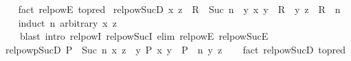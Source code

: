 \begin{isabellebody}
%
\isadelimproof
\ \ %
\endisadelimproof
%
\isatagproof
{}\isamarkupfalse%
\ {\isacharparenleft}{\kern0pt}fact\ relpow{\isacharunderscore}{\kern0pt}E\ {\isacharbrackleft}{\kern0pt}to{\isacharunderscore}{\kern0pt}pred{\isacharbrackright}{\kern0pt}{\isacharparenright}{\kern0pt}%
\endisatagproof
{\isafoldproof}%
%
\isadelimproof
\isanewline
%
\endisadelimproof
\isanewline
{}\isamarkupfalse%
\ relpow{\isacharunderscore}{\kern0pt}Suc{\isacharunderscore}{\kern0pt}D{}{\isacharcolon}{\kern0pt}\ {\isachardoublequoteopen}{\isacharparenleft}{\kern0pt}x{\isacharcomma}{\kern0pt}\ z{\isacharparenright}{\kern0pt}\ {\isasymin}\ R\ {\isacharcircum}{\kern0pt}{\isacharcircum}{\kern0pt}\ Suc\ n\ {\isasymLongrightarrow}\ {\isacharparenleft}{\kern0pt}{\isasymexists}y{\isachardot}{\kern0pt}\ {\isacharparenleft}{\kern0pt}x{\isacharcomma}{\kern0pt}\ y{\isacharparenright}{\kern0pt}\ {\isasymin}\ R\ {\isasymand}\ {\isacharparenleft}{\kern0pt}y{\isacharcomma}{\kern0pt}\ z{\isacharparenright}{\kern0pt}\ {\isasymin}\ R\ {\isacharcircum}{\kern0pt}{\isacharcircum}{\kern0pt}\ n{\isacharparenright}{\kern0pt}{\isachardoublequoteclose}\isanewline
%
\isadelimproof
\ \ %
\endisadelimproof
%
\isatagproof
{}\isamarkupfalse%
\ {\isacharparenleft}{\kern0pt}induct\ n\ arbitrary{\isacharcolon}{\kern0pt}\ x\ z{\isacharparenright}{\kern0pt}\isanewline
\ \ \ \ {\isacharparenleft}{\kern0pt}blast\ intro{\isacharcolon}{\kern0pt}\ relpow{\isacharunderscore}{\kern0pt}{}{\isacharunderscore}{\kern0pt}I\ relpow{\isacharunderscore}{\kern0pt}Suc{\isacharunderscore}{\kern0pt}I\ elim{\isacharcolon}{\kern0pt}\ relpow{\isacharunderscore}{\kern0pt}{}{\isacharunderscore}{\kern0pt}E\ relpow{\isacharunderscore}{\kern0pt}Suc{\isacharunderscore}{\kern0pt}E{\isacharparenright}{\kern0pt}{\isacharplus}{\kern0pt}%
\endisatagproof
{\isafoldproof}%
%
\isadelimproof
\isanewline
%
\endisadelimproof
\isanewline
{}\isamarkupfalse%
\ relpowp{\isacharunderscore}{\kern0pt}Suc{\isacharunderscore}{\kern0pt}D{}{\isacharcolon}{\kern0pt}\ {\isachardoublequoteopen}{\isacharparenleft}{\kern0pt}P\ {\isacharcircum}{\kern0pt}{\isacharcircum}{\kern0pt}\ Suc\ n{\isacharparenright}{\kern0pt}\ x\ z\ {\isasymLongrightarrow}\ {\isasymexists}y{\isachardot}{\kern0pt}\ P\ x\ y\ {\isasymand}\ {\isacharparenleft}{\kern0pt}P\ {\isacharcircum}{\kern0pt}{\isacharcircum}{\kern0pt}\ n{\isacharparenright}{\kern0pt}\ y\ z{\isachardoublequoteclose}\isanewline
%
\isadelimproof
\ \ %
\endisadelimproof
%
\isatagproof
{}\isamarkupfalse%
\ {\isacharparenleft}{\kern0pt}fact\ relpow{\isacharunderscore}{\kern0pt}Suc{\isacharunderscore}{\kern0pt}D{}\ {\isacharbrackleft}{\kern0pt}to{\isacharunderscore}{\kern0pt}pred{\isacharbrackright}{\kern0pt}{\isacharparenright}{\kern0pt}%

\end{isabellebody}
